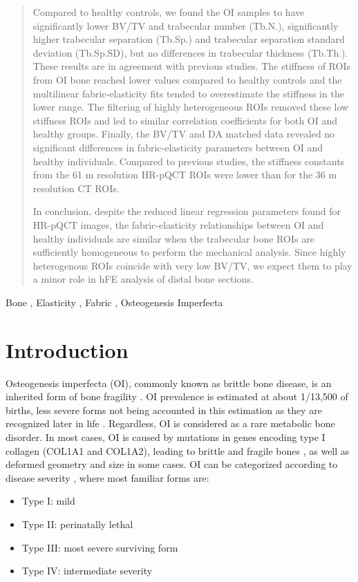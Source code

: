 \documentclass[a4paper,fleqn]{DC_ArtStyle}
\begin{document}
\begin{abstract}
	Compared to healthy controls, we found the OI samples to have significantly lower BV/TV and trabecular number (Tb.N.), significantly higher trabecular separation (Tb.Sp.) and trabecular separation standard deviation (Tb.Sp.SD), but no differences in trabecular thickness (Tb.Th.). These results are in agreement with previous studies. The stiffness of ROIs from OI bone reached lower values compared to healthy controls and the multilinear fabric-elasticity fits tended to overestimate the stiffness in the lower range. The filtering of highly heterogeneous ROIs removed these low stiffness ROIs and led to similar correlation coefficients for both OI and healthy groups. Finally, the BV/TV and DA matched data revealed no significant differences in fabric-elasticity parameters between OI and healthy individuals. Compared to previous studies, the stiffness constants from the 61 \si{\micro}m resolution HR-pQCT ROIs were lower than for the 36 \si{\micro}m resolution \si{\micro}CT ROIs.
	
	In conclusion, despite the reduced linear regression parameters found for HR-pQCT images, the fabric-elasticity relationships between OI and healthy individuals are similar when the trabecular bone ROIs are sufficiently homogeneous to perform the mechanical analysis. Since highly heterogenous ROIs coincide with very low BV/TV, we expect them to play a minor role in hFE analysis of distal bone sections.
\end{abstract}

\begin{keywords}
Bone \sep
Elasticity \sep
Fabric \sep
Osteogenesis Imperfecta
\end{keywords}


\maketitle

%
%
%
%
%
%
\section{Introduction}

Osteogenesis imperfecta (OI), commonly known as brittle bone disease, is an inherited form of bone fragility \cite{Tournis2018}. OI prevalence is estimated at about  1/13,500 of births, less severe forms not being accounted in this estimation as they are recognized later in life \cite{Lindahl2015}. Regardless, OI is considered as a rare metabolic bone disorder. In most cases, OI is caused by mutations in genes encoding type I collagen (COL1A1 and COL1A2), leading to brittle and fragile bones \cite{LIM2017}, as well as deformed geometry and size in some cases. OI can be categorized according to disease severity \cite{Mortier2019}, where most familiar forms are:
\begin{itemize}
	\item Type I: mild
	\item Type II: perinatally lethal
	\item Type III: most severe surviving form
	\item Type IV: intermediate severity
\end{itemize}
\end{document}
